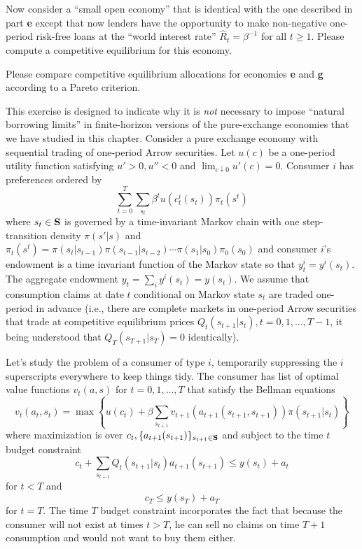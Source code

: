 \medskip
{} Now consider a ``small open economy'' that is identical with the one described in part {\bf e} except
that now lenders have the opportunity to make non-negative  one-period risk-free loans at the ``world interest rate''
$\hat R_t = \beta^{-1}$ for all $t \geq 1$.  Please compute a competitive equilibrium for this economy.  

\medskip
{} Please compare competitive equilibrium allocations for economies {\bf e} and {\bf g} according to a Pareto
criterion.


\medskip

 This exercise is designed to  indicate why it is {\it not\/} necessary to impose ``natural borrowing limits'' 
in  finite-horizon versions of the pure-exchange economies that we have studied in this chapter. Consider a pure exchange economy with sequential trading of one-period Arrow securities. Let $u(c)$ be a one-period utility 
function satisfying $u' > 0, u'' < 0$ and $\lim_{c \downarrow 0} u'(c) = 0$.
Consumer $i$ has preferences ordered by
$$ \sum_{t=0}^T \sum_{s_t} \beta^t u(c^i_t(s_t)) \pi_t(s^t)  $$
where $s_t \in {\bf S}$ is governed by a time-invariant Markov chain with one step-transition density
$\pi(s' | s)$ and $\pi_t(s^t) = \pi(s_t| s_{t-1}) \pi(s_{t-1}| s_{t-2}) \cdots \pi(s_1 | s_0) \pi_0(s_0)$ and
consumer $i$'s endowment is a time invariant function of the Markov state so that
$y_t^i = y^i(s_t)$. The aggregate endowment $y_t = \sum_i y^i(s_t) = y(s_t)$.   We assume that consumption
claims at date $t$ conditional on Markov state $s_t$ are traded one-period in advance (i.e., there are complete markets in
one-period Arrow securities that trade at competitive equilibrium prices $Q_t(s_{t+1} | s_t), t =0, 1, \ldots, T-1$, it being
understood that $Q_T(s_{T+1}|s_T) = 0$ identically). 


Let's study the problem of  a consumer of type $i$, temporarily suppressing the $i$ superscripts everywhere 
to keep things tidy.  The consumer has list of optimal value functions $v_t(a, s)$ for $t = 0, 1, \ldots, T$ that satisfy
the Bellman equations
$$ v_t(a_t, s_t) = \max \left\{ u(c_t) + \beta \sum_{s_{t+1}} v_{t+1} (a_{t+1}(s_{t+1}, s_{t+1})) \pi(s_{t+1}|s_t)  \right\}$$
where  maximization is over $c_t, \{a_{t+1}(s_{t+1})\}_{s_{t+1} \in {\bf S}}$ and subject to the time
$t$ budget constraint
$$ c_t + \sum_{s_{t+1}} Q_t(s_{t+1} | s_t) a_{t+1}(s_{t+1}) \leq y(s_t) + a_t  $$
for $t < T$ and
$$ c_T \leq y(s_T) + a_T $$
for $t=T$.  The time $T$ budget constraint incorporates the fact that because the consumer will not exist
at times $t > T$, he can sell no claims on time $T+1$ consumption and would not want to buy them either.

